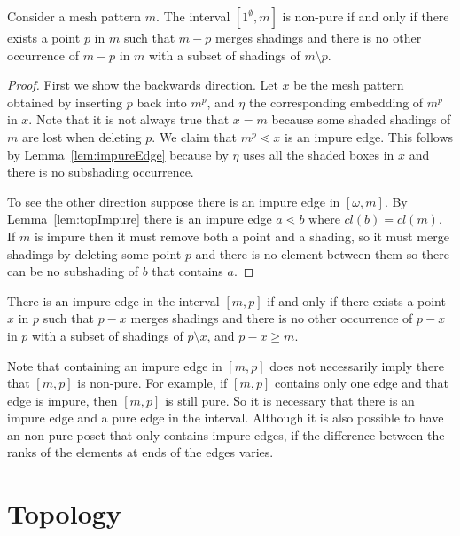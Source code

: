 \documentclass[11pt,a4paper,oneside]{article}
\begin{document}
\begin{prop}
Consider a mesh pattern $m$. The interval $[1^\emptyset,m]$ is non-pure if and only if there exists a point $p$ in $m$ such that $m-p$ merges shadings and there is no other occurrence of $m-p$ in $m$ with a subset of shadings of $m\setminus p$.
\begin{proof}
First we show the backwards direction. Let $x$  be the mesh pattern obtained by inserting $p$ back into $m^p$, and $\eta$ the corresponding embedding of $m^p$ in $x$. Note that it is not always true that $x=m$ because some shaded shadings of $m$ are lost when deleting $p$. We claim that $m^p\lessdot x$ is an impure edge. This follows by Lemma~\ref{lem:impureEdge} because by $\eta$ uses all the shaded boxes in $x$ and there is no subshading occurrence.

To see the other direction suppose there is an impure edge in $[\omega,m]$. By Lemma~\ref{lem:topImpure} there is an impure edge $a\lessdot b$ where $cl(b)=cl(m)$. If $m$ is impure then it must remove both a point and a shading, so it must merge shadings by deleting some point $p$ and there is no element between them so there can be no subshading of $b$ that contains $a$.
\end{proof}
\end{prop}

\begin{cor}
There is an impure edge in the interval $[m,p]$ if and only if there exists a point $x$ in $p$ such that $p-x$ merges shadings and there is no other occurrence of $p-x$ in $p$ with a subset of shadings of $p\setminus x$, and $p-x\ge m$.
\end{cor}

Note that containing an impure edge in $[m,p]$ does not necessarily imply there that $[m,p]$ is non-pure. For example, if $[m,p]$ contains only one edge and that edge is impure, then $[m,p]$ is still pure. So it is necessary that there is an impure edge and a pure edge in the interval. Although it is also possible to have an non-pure poset that only contains impure edges, if the difference between the ranks of the elements at ends of the edges varies.


\section{Topology}
\end{document}
